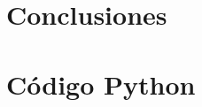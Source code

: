 \documentclass[12pt,a4paper,twoside,openright,titlepage,final]{article}
\begin{document}
\section{Conclusiones}

\newpage

\section{Código Python}

\begin{verbatim}

\end{verbatim}
\end{document}
